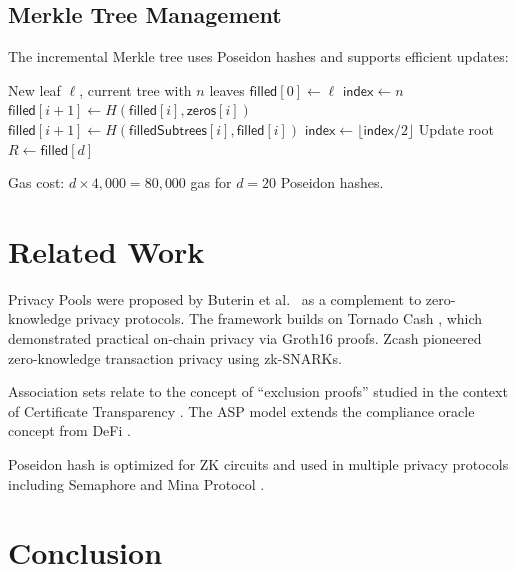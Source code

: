 \documentclass[11pt,a4paper]{article}
\begin{document}
\subsection{Merkle Tree Management}

The incremental Merkle tree uses Poseidon hashes and supports efficient updates:

\begin{algorithm}[H]
\caption{Incremental Merkle Tree Insert}
\label{alg:merkle}
\begin{algorithmic}[1]
\Require New leaf $\ell$, current tree with $n$ leaves
\State $\mathsf{filled}[0] \gets \ell$
\State $\mathsf{index} \gets n$
        \State $\mathsf{filled}[i+1] \gets H(\mathsf{filled}[i], \mathsf{zeros}[i])$
    \Else
        \State $\mathsf{filled}[i+1] \gets H(\mathsf{filledSubtrees}[i], \mathsf{filled}[i])$
    \EndIf
    \State $\mathsf{index} \gets \lfloor \mathsf{index} / 2 \rfloor$
\EndFor
\State Update root $R \gets \mathsf{filled}[d]$
\end{algorithmic}
\end{algorithm}

Gas cost: $d \times 4{,}000 = 80{,}000$ gas for $d = 20$ Poseidon hashes.

\section{Related Work}\label{sec:related}

Privacy Pools were proposed by Buterin et al.\ \cite{buterin2023privacy} as a complement to zero-knowledge privacy protocols. The framework builds on Tornado Cash \cite{pertsev2019tornado}, which demonstrated practical on-chain privacy via Groth16 proofs. Zcash \cite{hopwood2016zcash} pioneered zero-knowledge transaction privacy using zk-SNARKs.

Association sets relate to the concept of ``exclusion proofs'' studied in the context of Certificate Transparency \cite{laurie2013revocation}. The ASP model extends the compliance oracle concept from DeFi \cite{chainanalysis2023}.

Poseidon hash \cite{grassi2021poseidon} is optimized for ZK circuits and used in multiple privacy protocols including Semaphore \cite{semaphore2020} and Mina Protocol \cite{mina2020}.

\section{Conclusion}\label{sec:conclusion}
\end{document}

